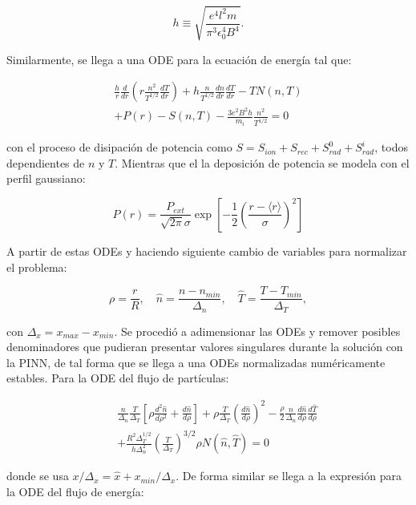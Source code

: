 \begin{equation}
	h \equiv \sqrt{\frac{e^4 l^2 m}{\pi^3 \epsilon_0^4 B^4}}.
\end{equation}

Similarmente, se llega a una ODE para la ecuación de energía tal que:

\begin{eqnarray}\label{eq:energyODE}
	\frac{h}{r}\frac{d}{dr}\left(r\frac{n^2}{T^{1/2}}\frac{dT}{dr}\right) + h\frac{n}{T^{1/2}}\frac{dn}{dr}\frac{dT}{dr}  - TN(n,T) \nonumber \\
	+ P(r) - S(n, T) - \frac{3e^2B^2 h}{m_i}\frac{n^2}{T^{1/2}}= 0
\end{eqnarray}

con el proceso de disipación de potencia como $S = S_{ion} + S_{rec} + S_{rad}^0+ S_{rad}^i$, todos dependientes de $n$ y $T$. Mientras que el la deposición de potencia se modela con el perfil gaussiano:

\begin{equation}
	P(r) = \frac{P_{ext}}{\sqrt{2\pi}\sigma}\exp{\left[-\frac{1}{2}\left(\frac{r - \langle r \rangle}{\sigma}\right)^2\right]}
\end{equation}

A partir de estas ODEs y haciendo siguiente cambio de variables para normalizar el problema:

\begin{equation}
	\rho = \frac{r}{R}, \quad \hat{n} = \frac{n - n_{min}}{\Delta_n}, \quad  \hat{T} = \frac{T - T_{min}}{\Delta_T},
\end{equation}

con $\Delta_x = x_{max} - x_{min}$. Se procedió a adimensionar las ODEs y remover posibles denominadores que pudieran presentar valores singulares durante la solución con la PINN, de tal forma que se llega a una ODEs normalizadas numéricamente estables. Para la ODE del flujo de partículas:

\begin{eqnarray}\label{eq:partODEnorm}
	&&\frac{n}{\Delta_n}\frac{T}{\Delta_T}\left[\rho\frac{d^2\hat{n}}{d\rho^2} + \frac{d\hat{n}}{d\rho}\right] + \rho\frac{T}{\Delta_T}\left(\frac{d\hat{n}}{d\rho}\right)^2- \frac{\rho}{2}\frac{n}{\Delta_n}\frac{d\hat{n}}{d\rho}\frac{d\hat{T}}{d\rho} \nonumber \\
	 &&+ \frac{R^2\Delta_T^{1/2}}{h\Delta_n^2}\left(\frac{T}{\Delta_T}\right)^{3/2}\rho N(\hat{n}, \hat{T}) = 0
\end{eqnarray}

donde se usa $x / \Delta_x =\hat{x} + x_{min}/\Delta_x$. De forma similar se llega a la expresión para la ODE del flujo de energía:

